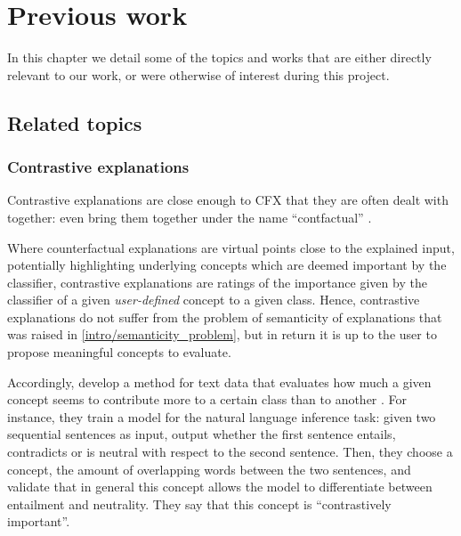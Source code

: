 \documentclass[../main.tex]{subfiles}
\begin{document}
\chapter{Previous work}
\label{ch:previous_work}

In this chapter we detail some of the topics and works that are either directly relevant to our work, or were otherwise of interest during this project.

\section{Related topics}

\subsection{Contrastive explanations}

Contrastive explanations are close enough to CFX that they are often dealt with together: \citeauthor{stepinSurvey2021} even bring them together under the name ``contfactual'' \cite{stepinSurvey2021}.

Where counterfactual explanations are virtual points close to the explained input, potentially highlighting underlying concepts which are deemed important by the classifier, contrastive explanations are ratings of the importance given by the classifier of a given \emph{user-defined} concept to a given class.
Hence, contrastive explanations do not suffer from the problem of semanticity of explanations that was raised in \autoref{intro/semanticity_problem}, but in return it is up to the user to propose meaningful concepts to evaluate.

Accordingly, \citeauthor{jacoviContrastive2021} develop a method for text data that evaluates how much a given concept seems to contribute more to a certain class than to another \cite{jacoviContrastive2021}.
For instance, they train a model for the natural language inference task: given two sequential sentences as input, output whether the first sentence entails, contradicts or is neutral with respect to the second sentence.
Then, they choose a concept, \eg{} the amount of overlapping words between the two sentences, and validate that in general this concept allows the model to differentiate between entailment and neutrality.
They say that this concept is ``contrastively important''.
\end{document}
